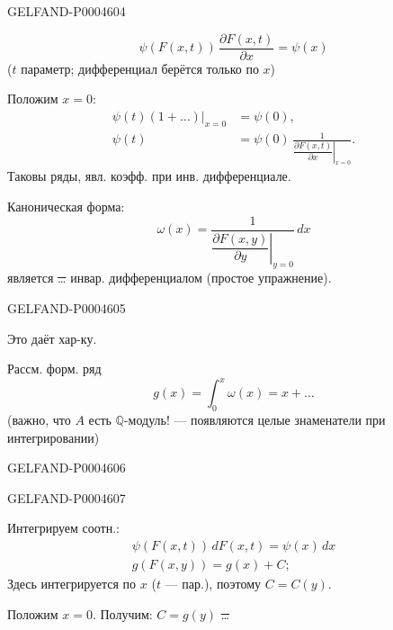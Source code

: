 \begin{GelfandAdjacentEvidence}{GELFAND-P000460}{4}

\[
\psi(F(x,t))\,\frac{\partial F(x,t)}{\partial x}=\psi(x)
\]
($t$ параметр; дифференциал берётся только по $x$)

Положим $x=0$:
\[
\begin{aligned}
\left.\psi(t)(1+\ldots)\right|_{x=0}&=\psi(0),\\
\psi(t)&=\psi(0)\,\frac{1}{\left.\dfrac{\partial F(x,t)}{\partial x}\right|_{x=0}}.
\end{aligned}
\]
Таковы ряды, явл. коэфф. при инв. дифференциале.

Каноническая форма:
\[
\omega(x)=\frac{1}{\left.\dfrac{\partial F(x,y)}{\partial y}\right|_{y=0}}\,dx
\]
является \sout{\ldots} инвар. дифференциалом (простое упражнение).
\end{GelfandAdjacentEvidence}
\begin{GelfandAdjacentEvidence}{GELFAND-P000460}{5}


Это даёт хар-ку.

Рассм. форм. ряд
\[
g(x)=\int_0^x\omega(x)=x+\ldots
\]
(важно, что $A$ есть $\mathbb Q$-модуль! — появляются целые знаменатели при интегрировании)
\end{GelfandAdjacentEvidence}
\begin{GelfandAdjacentEvidence}{GELFAND-P000460}{6}

\end{GelfandAdjacentEvidence}
\begin{GelfandAdjacentEvidence}{GELFAND-P000460}{7}


Интегрируем соотн.:
\[
\begin{gathered}
\psi(F(x,t))\,dF(x,t)=\psi(x)\,dx\\
g(F(x,y))=g(x)+C;
\end{gathered}
\]
Здесь интегрируется по $x$ ($t$ — пар.), поэтому $C=C(y)$.

Положим $x=0$. Получим: $C=g(y)$ \sout{\ldots}
\end{GelfandAdjacentEvidence}
